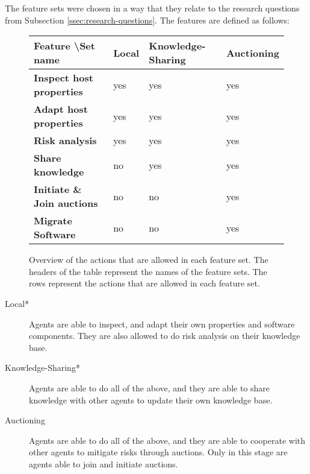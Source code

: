 The feature sets were chosen in a way that they relate to the research questions from Subsection \ref{ssec:research-questions}. The features are defined as follows:

\begin{figure}[H]
        \centering
        \begin{tabular}{l|l|l|l}
            \textbf{Feature \textbackslash Set name} & \textbf{Local} & \textbf{Knowledge-Sharing} & \textbf{Auctioning} \\ \hline
            \textbf{Inspect host properties}     & yes            & yes                        & yes                 \\
            \textbf{Adapt host properties}       & yes            & yes                        & yes                 \\
            \textbf{Risk analysis}               & yes            & yes                        & yes                 \\
            \textbf{Share knowledge}             & no             & yes                        & yes                 \\
            \textbf{Initiate \& Join auctions}   & no             & no                         & yes                 \\
            \textbf{Migrate Software}            & no             & no                         & yes                            
        \end{tabular}
        \caption{\label{fig:experiment-features}Overview of the actions that are allowed in each feature set. The headers of the table represent the names of the feature sets. The rows represent the actions that are allowed in each feature set.}
\end{figure}

\begin{description}
    \item[Local*]             Agents are able to inspect, and adapt their own properties and software components. They are also allowed to do risk analysis on their knowledge base. 
    \item[Knowledge-Sharing*] Agents are able to do all of the above, and they are able to share knowledge with other agents to update their own knowledge base.
    \item[Auctioning]         Agents are able to do all of the above, and they are able to cooperate with other agents to mitigate risks through auctions. Only in this stage are agents able to join and initiate auctions.
\end{description}

